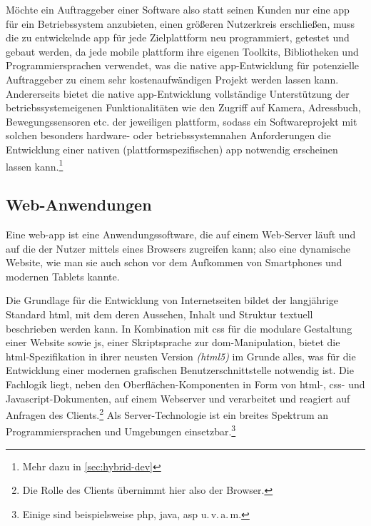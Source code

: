 Möchte ein Auftraggeber einer Software also statt seinen Kunden nur eine \gls{app} für ein Betriebssystem anzubieten, einen größeren Nutzerkreis erschließen, muss die zu entwickelnde \gls{app} für jede Zielplattform neu programmiert, getestet und gebaut werden, da jede mobile \gls{plattform} ihre eigenen Toolkits, Bibliotheken und Programmiersprachen verwendet, was die native \gls{app}-Entwicklung für potenzielle Auftraggeber zu einem sehr kostenaufwändigen Projekt werden lassen kann.
Andererseits bietet die native \gls{app}-Entwicklung vollständige Unterstützung der betriebssystemeigenen Funktionalitäten wie den Zugriff auf Kamera, Adressbuch, Bewegungssensoren etc. der jeweiligen \gls{plattform}, sodass ein Softwareprojekt mit solchen besonders hardware- oder betriebssystemnahen Anforderungen die Entwicklung einer nativen (plattformspezifischen) \gls{app} notwendig erscheinen lassen kann.\footnote{Mehr dazu in \autoref{sec:hybrid-dev}}

\subsection{Web-Anwendungen}\label{sec:web-app}

Eine \gls{web-app} ist eine Anwendungssoftware, die auf einem Web-Server läuft und auf die der Nutzer mittels eines Browsers zugreifen kann; also eine dynamische Website, wie man sie auch schon vor dem Aufkommen von Smartphones und modernen Tablets kannte. 

Die Grundlage für die Entwicklung von Internetseiten bildet der langjährige Standard \gls{html}, mit dem deren Aussehen, Inhalt und Struktur textuell beschrieben werden kann. 
In Kombination mit \gls{css} für die modulare Gestaltung einer Website sowie \gls{js}, einer Skriptsprache zur \gls{dom}-Manipulation, bietet die \gls{html}-Spezifikation in ihrer neusten Version \textit{(\gls{html5})} im Grunde alles, was für die Entwicklung einer modernen grafischen Benutzerschnittstelle notwendig ist. 
Die Fachlogik liegt, neben den Oberflächen-Komponenten in Form von \mbox{\gls{html}-,} \gls{css}- und Javascript-Dokumenten, auf einem Webserver und verarbeitet und reagiert auf Anfragen des Clients.\footnote{Die Rolle des Clients übernimmt hier also der Browser.}
Als Server-Technologie ist ein breites Spektrum an Programmiersprachen und Umgebungen einsetzbar.\footnote{Einige sind beispielsweise \gls*{php}, \gls*{java}, \gls*{asp} u.\,v.\,a.\,m.}

